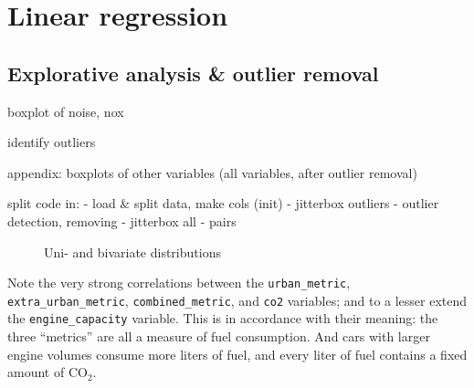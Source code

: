 \documentclass[a4paper, 12pt]{article}
\newcommand{\var}[1]{\texttt{#1}}
\begin{document}


\section{Linear regression}

\subsection*{Explorative analysis \& outlier removal}

boxplot of noise, nox

identify outliers

appendix: boxplots of other variables (all variables, after outlier removal)

split code in:
- load \& split data, make cols (init)
- jitterbox outliers
- outlier detection, removing
- jitterbox all
- pairs

\begin{figure}
  \caption{Uni- and bivariate distributions}
  \label{pairs}
\end{figure}

Note the very strong correlations between the \var{urban\_metric}, \var{extra\_urban\_metric}, \var{combined\_metric}, and \var{co2} variables; and to a lesser extend the \var{engine\_capacity} variable. This is in accordance with their meaning: the three ``metrics'' are all a measure of fuel consumption. And cars with larger engine volumes consume more liters of fuel, and every liter of fuel contains a fixed amount of $\mathrm{CO_2}$.
\end{document}
